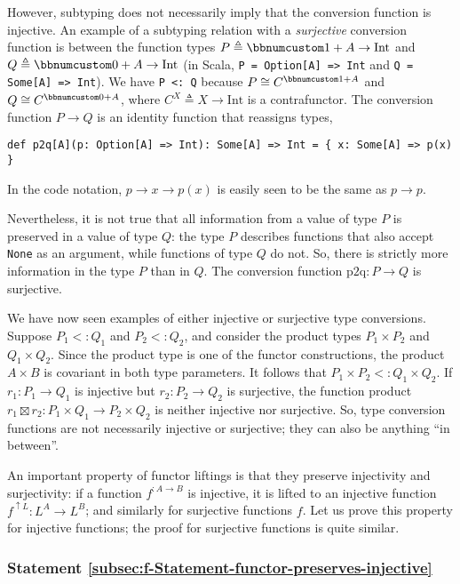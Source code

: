 However, subtyping does not necessarily imply that the conversion
function is injective. An example of a subtyping relation with a \emph{surjective}
conversion function is between the function types $P\triangleq\bbnum 1+A\rightarrow\text{Int}$
and $Q\triangleq\bbnum 0+A\rightarrow\text{Int}$ (in Scala, \lstinline!P = Option[A] => Int!
and \lstinline!Q = Some[A] => Int!). We have \lstinline!P <: Q!
because $P\cong C^{\bbnum 1+A}$ and $Q\cong C^{\bbnum 0+A}$, where
$C^{X}\triangleq X\rightarrow\text{Int}$ is a contrafunctor. The
conversion function $P\rightarrow Q$ is an identity function that
reassigns types,
\begin{lstlisting}
def p2q[A](p: Option[A] => Int): Some[A] => Int = { x: Some[A] => p(x) }
\end{lstlisting}
In the code notation, $p\rightarrow x\rightarrow p(x)$ is easily
seen to be the same as $p\rightarrow p$. 

Nevertheless, it is not true that all information from a value of
type $P$ is preserved in a value of type $Q$: the type $P$ describes
functions that also accept \lstinline!None! as an argument, while
functions of type $Q$ do not. So, there is strictly more information
in the type $P$ than in $Q$. The conversion function $\text{p2q}:P\rightarrow Q$
is surjective.

We have now seen examples of either injective or surjective type conversions.
Suppose $P_{1}<:Q_{1}$ and $P_{2}<:Q_{2}$, and consider the product
types $P_{1}\times P_{2}$ and $Q_{1}\times Q_{2}$. Since the product
type is one of the functor constructions, the product $A\times B$
is covariant in both type parameters. It follows that $P_{1}\times P_{2}<:Q_{1}\times Q_{2}$.
If $r_{1}:P_{1}\rightarrow Q_{1}$ is injective but $r_{2}:P_{2}\rightarrow Q_{2}$
is surjective, the function product $r_{1}\boxtimes r_{2}:P_{1}\times Q_{1}\rightarrow P_{2}\times Q_{2}$
is neither injective nor surjective. So, type conversion functions
are not necessarily injective or surjective; they can also be anything
``in between''.

An important property of functor liftings is that they preserve injectivity
and surjectivity: if a function $f^{:A\rightarrow B}$ is injective,
it is lifted to an injective function $f^{\uparrow L}:L^{A}\rightarrow L^{B}$;
and similarly for surjective functions $f$. Let us prove this property
for injective functions; the proof for surjective functions is quite
similar.

\subsubsection{Statement \label{subsec:f-Statement-functor-preserves-injective}\ref{subsec:f-Statement-functor-preserves-injective}}

